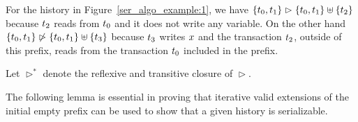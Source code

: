 For the history in Figure~\ref{ser_algo_example:1}, we have $\{{t}_0,{t}_1\}\vartriangleright \{{t}_0,{t}_1\}\uplus\{{t}_2\}$ because ${t}_2$ reads from ${t}_0$ and it does not write any variable. On the other hand $\{{t}_0,{t}_1\}\not\vartriangleright \{{t}_0,{t}_1\}\uplus\{{t}_3\}$ because ${t}_3$ writes ${x}$ and the transaction ${t}_2$, outside of this prefix, reads from the transaction ${t}_0$ included in the prefix.

Let $\vartriangleright^*$ denote the reflexive and transitive closure of $\vartriangleright$.

The following lemma is essential in proving that iterative valid extensions of the initial empty prefix can be used to show that a given history is serializable.

%
%
%
%
%

